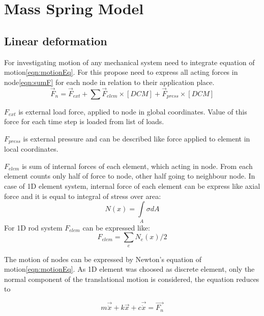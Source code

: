 \section*{Mass Spring Model}
\subsection*{Linear deformation}
For investigating motion of any mechanical system need to integrate equation of
motion\eqref{eqn:motionEq}. For this propose need to express all acting forces in
node\eqref{eqn:sumF} for each node in relation to their application place. 
\begin{equation}\label{eqn:sumF}
   \vec{F}_n= \vec{F}_{ext} + \sum\vec{F}_{elem}\times[DCM] + \vec{F}_{press}\times[DCM]
\end{equation}\par
$F_{ext}$ is external load force, applied to node in global coordinates. Value of this force for
each time step is loaded from list of loads.\par $F_{press}$ is external pressure and can be
described like force applied to element in local coordinates.\par $F_{elem}$ is sum of internal
forces of each element, which acting in node. From each element counts only half of force to node,
other half going to neighbour node. In case of 1D element system, internal force of each element can
be express like axial force and it is equal to integral of stress over area:
\begin{equation}\label{eqn:Nx}
  N(x)= \int\limits_A \sigma dA
\end{equation}
For 1D rod system $F_{elem}$ can be expressed like:
\begin{equation}\label{eqn:Felem}
  F_{elem} = \sum_{e}N_e(x)/2
\end{equation}\par
The motion of nodes can be expressed by Newton's equation of motion\ref{eqn:motionEq}. As 1D
element was choosed as discrete element, only the normal component of the
translational motion is considered, the equation reduces to\par
\begin{equation}\label{eqn:motionEq}
  m\vec{\ddot{x}} + k\vec{x} + c\vec{\dot{x}} = \vec{F_n}
\end{equation}
